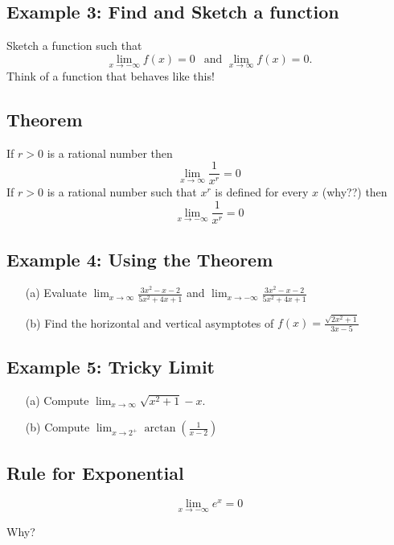 \documentclass[10pt]{book}
\theoremstyle{definition}
\begin{document}
\subsection*{Example 3: Find and Sketch a function}
Sketch a function such that
\[
\lim_{x\rightarrow -\infty}f(x)=0\ \ \text{ and } \lim_{x\rightarrow \infty}f(x)=0.
\]
Think of a function that behaves like this!\vspace{2cm}
\begin{tcolorbox}
\subsection*{Theorem}
If $r>0$ is a rational number then
\[
\lim_{x\rightarrow \infty}\frac{1}{x^r}=0
\]
If $r>0$ is a rational number such that $x^r$ is defined for every $x$ (why??) then
\[
\lim_{x\rightarrow -\infty}\frac{1}{x^r}=0
\]
\end{tcolorbox}
\subsection*{Example 4: Using the Theorem}
\begin{itemize}
    \item[(a)] Evaluate $\displaystyle\lim_{x\rightarrow \infty}\frac{3x^2-x-2}{5x^2+4x+1}$ and  $\displaystyle\lim_{x\rightarrow -\infty}\frac{3x^2-x-2}{5x^2+4x+1}$\vspace{6cm}
    \item[(b)] Find the horizontal and vertical asymptotes of $\displaystyle f(x)=\frac{\sqrt{2x^2+1}}{3x-5}$
\end{itemize}
\raggedbottom
\clearpage
\subsection*{Example 5: Tricky Limit}
\begin{itemize}
\item[(a)] Compute $\displaystyle\lim_{x\rightarrow \infty}\sqrt{x^2+1}-x$.\\
\vspace{3cm}
\item[(b)] Compute $\displaystyle \lim_{x\rightarrow 2^+}\arctan\left(\frac{1}{x-2}\right)$
\vspace{3cm}
\end{itemize}
\begin{tcolorbox}
\subsection*{Rule for Exponential}
\[\lim_{x\rightarrow -\infty}e^x=0\]

Why?
\end{tcolorbox}
\end{document}
